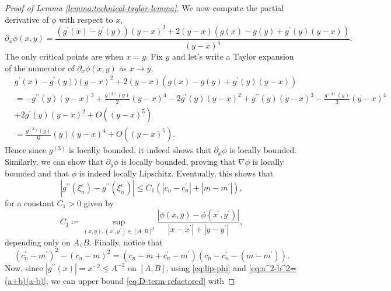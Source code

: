 \documentclass[11pt]{article}
\numberwithin{equation}{section}
\theoremstyle{definition}
\theoremstyle{remark}
\begin{document}
\begin{proof}[Proof of Lemma \ref{lemma:technical-taylor-lemma}]
    We now compute the partial derivative of $\phi$ with respect to $x$,
    \[
        \partial_x \phi (x,y) = \frac{(g^\prime(x) - g^\prime (y))(y - x)^2 + 2 (y - x)(g(x) - g(y) + g^\prime (y)(y - x))}{(y-x)^4}.
    \]
    The only critical points are when $x = y$. Fix $y$ and let's write a Taylor expansion of the numerator of $\partial_x \phi(x,y)$ as $x \rightarrow y$,
    \[
        \begin{aligned}
             & g^\prime(x) - g^\prime (y))(y - x)^2 + 2 (y - x)(g(x) - g(y) + g^\prime (y)(y - x))                                                                        \\
             & = -g^{\prime \prime}(y)(y - x)^3 + \frac{g^{(3)}(y)}{2} (y - x)^4  - 2g^{\prime}(y)(y - x)^2 + g^{\prime \prime }(y)(y - x)^3 - \frac{g^{(3)}(y)}{3}(y - x)^4 \\
             & + 2 g^\prime(y)(y - x)^2 + O((y - x)^5)                                                                                             \\
             & = \frac{g^{(3)}(y)}{6}(y) (y - x)^4 + O ((y - x)^5).
        \end{aligned}
    \]
    Hence since $g^{(3)}$ is locally bounded, it indeed shows that $\partial_x \phi$ is locally bounded. Similarly, we can show that $\partial_y \phi$ is locally bounded, proving that $\nabla \phi$ is locally bounded and that $\phi$ is indeed locally Lipschitz.
    Eventually, this shows that 
    \begin{equation}
        \label{eq:lip-phi}
        |g^{\prime \prime}(\xi_n^c) - g^{\prime \prime}(\xi_n^{c^\prime})| \leq C_1(|c_n - c_n^\prime| + |m - m^\prime|),
    \end{equation}
    for a constant $C_1 > 0$ given by 
    \begin{equation}
        \label{eq:lipschitz-constant-c1}
        C_1 \coloneqq \sup_{(x,y), (x^\prime, y^\prime) \in [A,B]^2} \frac{|\phi(x,y) - \phi(x^\prime, y^\prime)|}{|x - x^\prime| + |y - y^\prime|},
    \end{equation}
    depending only on $A,B$.
    Finally, notice that
    \begin{equation}
        \label{eq:a^2-b^2=(a+b)(a-b)}
        (c^\prime_n - m^\prime)^2- (c_n - m)^2 = (c_n - m + c^\prime_n - m^\prime)(c_n - c^\prime_n - (m - m^\prime)).
    \end{equation}
    Now, since $|g^{\prime \prime}(x)| = x^{-2} \leq A^{-2}$ on $[A,B]$, using \eqref{eq:lip-phi} and \eqref{eq:a^2-b^2=(a+b)(a-b)}, we can upper bound \eqref{eq:D-term-refactored} with

\end{proof}
\end{document}
